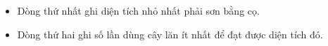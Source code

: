\begin{itemize}
	\item     Dòng thứ nhất ghi diện tích nhỏ nhất phải sơn bằng cọ.   
	\item     Dòng thứ hai ghi số lần dùng cây lăn ít nhất để đạt được diện tích đó.   
\end{itemize}